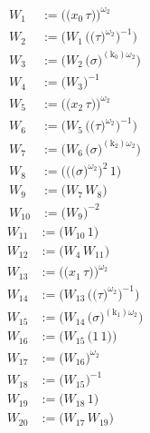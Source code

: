 \begin{align*}
W_{1} &:= \bigl(\bigl(x_{0}\,\tau\bigr)\bigr)^{\omega_2} \\
W_{2} &:= \bigl(W_{1}\,\bigl(\bigl(\tau\bigr)^{\omega_2}\bigr)^{-1}\bigr) \\
W_{3} &:= \bigl(W_{2}\,\bigl(\sigma\bigr)^{(\mathrm{k}_{0})\omega_2}\bigr) \\
W_{4} &:= \bigl(W_{3}\bigr)^{-1} \\
W_{5} &:= \bigl(\bigl(x_{2}\,\tau\bigr)\bigr)^{\omega_2} \\
W_{6} &:= \bigl(W_{5}\,\bigl(\bigl(\tau\bigr)^{\omega_2}\bigr)^{-1}\bigr) \\
W_{7} &:= \bigl(W_{6}\,\bigl(\sigma\bigr)^{(\mathrm{k}_{2})\omega_2}\bigr) \\
W_{8} &:= \bigl(\bigl(\bigl(\sigma\bigr)^{\omega_2}\bigr)^{2}\,1\bigr) \\
W_{9} &:= \bigl(W_{7}\,W_{8}\bigr) \\
W_{10} &:= \bigl(W_{9}\bigr)^{-2}
\end{align*}
\begin{align*}
W_{11} &:= \bigl(W_{10}\,1\bigr) \\
W_{12} &:= \bigl(W_{4}\,W_{11}\bigr) \\
W_{13} &:= \bigl(\bigl(x_{1}\,\tau\bigr)\bigr)^{\omega_2} \\
W_{14} &:= \bigl(W_{13}\,\bigl(\bigl(\tau\bigr)^{\omega_2}\bigr)^{-1}\bigr) \\
W_{15} &:= \bigl(W_{14}\,\bigl(\sigma\bigr)^{(\mathrm{k}_{1})\omega_2}\bigr) \\
W_{16} &:= \bigl(W_{15}\,\bigl(1\,1\bigr)\bigr) \\
W_{17} &:= \bigl(W_{16}\bigr)^{\omega_2} \\
W_{18} &:= \bigl(W_{15}\bigr)^{-1} \\
W_{19} &:= \bigl(W_{18}\,1\bigr) \\
W_{20} &:= \bigl(W_{17}\,W_{19}\bigr)
\end{align*}
